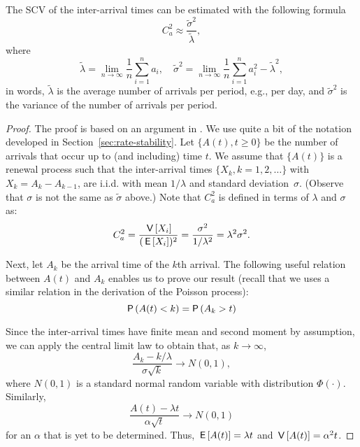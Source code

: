 \begin{theorem} The SCV of the inter-arrival times can be estimated
  with the following formula
\begin{equation*}
C_a^2 \approx \frac{\tilde \sigma^2}{\tilde \lambda},
\end{equation*}
where 
\begin{equation*}
\tilde  \lambda = \lim_{n\to\infty} \frac 1n  \sum_{i=1}^n a_i,\quad  
\tilde  \sigma^2 = \lim_{n\to\infty} \frac 1 n \sum_{i=1}^n a_i^2 - \tilde \lambda^2,
\end{equation*}
in words, $\tilde \lambda$ is the average number of arrivals per
period, e.g., per day, and $\tilde \sigma^2 $ is the variance of the
number of arrivals per period.
\end{theorem}

\begin{proof}
  The proof is based on an argument in \cite{cox62:_renew_theor}. We
  use quite a bit of the notation developed in
  Section~\ref{sec:rate-stability}. Let $\{A(t), t\geq 0\}$ be the
  number of arrivals that occur up to (and including) time $t$. We
  assume that $\{A(t)\}$ is a renewal process such that the
  inter-arrival times $\{X_k, k=1, 2, \ldots\}$ with
  $X_k = A_{k}-A_{k-1}$, are i.i.d. with mean $1/\lambda$ and standard
  deviation~$\sigma$. (Observe that $\sigma$ is not the same as
  $\tilde \sigma$ above.) Note that $C_a^2$ is defined in terms of
  $\lambda$ and $\sigma$ as:
\begin{equation*}
C_a^2 = \frac{\,\mathsf{V}\left[X_i\right]}{(\,\mathsf{E}\left[X_i\right])^2} = \frac{\sigma^2}{1/\lambda^2} = \lambda^2 \sigma^2.
\end{equation*}

Next, let $A_k$ be the arrival time of the $k$th arrival. The
following useful relation between $A(t)$ and $A_k$ enables us to prove
our result (recall that we uses a similar relation in the derivation
of the Poisson process):
\begin{equation*}
\P{A(t) < k} = \P{A_k > t}
\end{equation*}

Since the inter-arrival times have finite mean and second moment by
assumption, we can apply the central limit law to obtain that, as
$k\to\infty$,
\begin{equation*}
\frac{A_k -k/\lambda}{\sigma \sqrt k} \to N(0,1),
\end{equation*}
where $N(0,1)$ is a standard normal random variable with
distribution $\Phi(\cdot)$.  Similarly,
%
\begin{equation*}
\frac{A(t) -\lambda t}{\alpha \sqrt t} \to N(0,1)
\end{equation*}
for an $\alpha$ that is yet to be determined. Thus,
$\,\mathsf{E}\left[A(t)\right] = \lambda t$ and $\,\mathsf{V}\left[A(t)\right]=\alpha^2 t$.


\end{proof}
